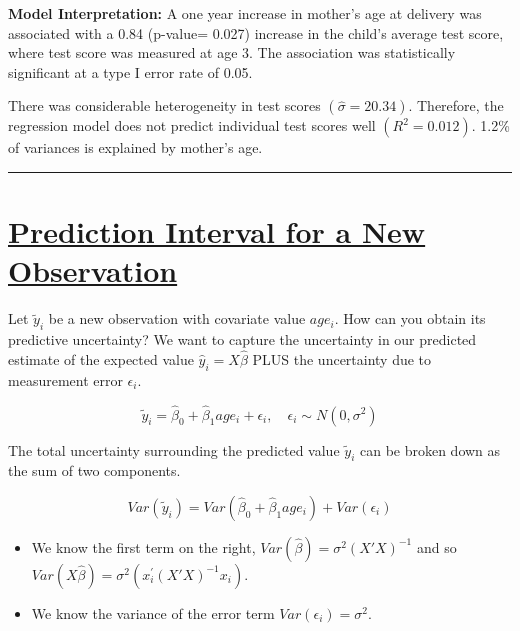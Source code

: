 \documentclass[
  letterpaper,
  DIV=11,
  numbers=noendperiod]{scrreprt}
\providecommand{\tightlist}{%
  \setlength{\itemsep}{0pt}\setlength{\parskip}{0pt}}\usepackage{longtable,booktabs,array}
\begin{document}
\textbf{Model Interpretation:} A one year increase in mother's age at
delivery was associated with a 0.84 (p-value= 0.027) increase in the
child's average test score, where test score was measured at age 3. The
association was statistically significant at a type I error rate of
0.05.

There was considerable heterogeneity in test scores
\((\hat{\sigma} = 20.34)\). Therefore, the regression model does not
predict individual test scores well \((R^2 = 0.012)\). 1.2\% of
variances is explained by mother's age.

\begin{center}\rule{0.5\linewidth}{0.5pt}\end{center}

\hypertarget{prediction-interval-for-a-new-observation}{%
\section*{\texorpdfstring{\ul{Prediction Interval for a New
Observation}}{Prediction Interval for a New Observation}}\label{prediction-interval-for-a-new-observation}}


Let \(\tilde{y}_i\) be a new observation with covariate value \(age_i\).
How can you obtain its predictive uncertainty? We want to capture the
uncertainty in our predicted estimate of the expected value
\(\hat{y}_i = X\hat{\beta}\) PLUS the uncertainty due to measurement
error \(\epsilon_i\).

\[
\tilde{y}_i = \hat{\beta}_0 + \hat{\beta}_1 age_i + \epsilon_i, \quad \epsilon_i \sim N(0, \sigma^2)
\]

The total uncertainty surrounding the predicted value \(\tilde{y}_i\)
can be broken down as the sum of two components.

\[
Var(
\tilde{y}_i) = Var(\hat{\beta}_0 + \hat{\beta}_1 age_i) + Var(\epsilon_i)
\]

\begin{itemize}
\tightlist
\item
  We know the first term on the right,
  \(Var(\hat{\beta}) = \sigma^2 (X'X)^{-1}\) and so
  \(Var(X\hat{\beta}) = \sigma^2 (x_i^{'} (X'X)^{-1} x_i)\).
\item
  We know the variance of the error term \(Var(\epsilon_i) = \sigma^2\).
\end{itemize}
\end{document}
